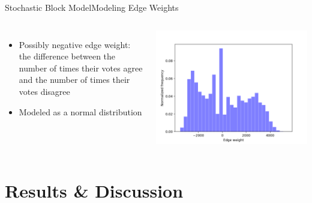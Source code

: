 \documentclass[xcolor=dvipsnames]{beamer}
\begin{document}
\begin{frame}{Stochastic Block Model}{Modeling Edge Weights}
\begin{columns}
  \begin{itemize}
    \item Possibly negative edge weight: the difference between the number of times their votes agree and the number of times their votes disagree
    \item Modeled as a normal distribution
  \end{itemize}
  \includegraphics[width=\linewidth]{sbm_edge_weight_neg_hist}
  \end{columns}
\end{frame}

\section{Results \& Discussion}
\end{document}
